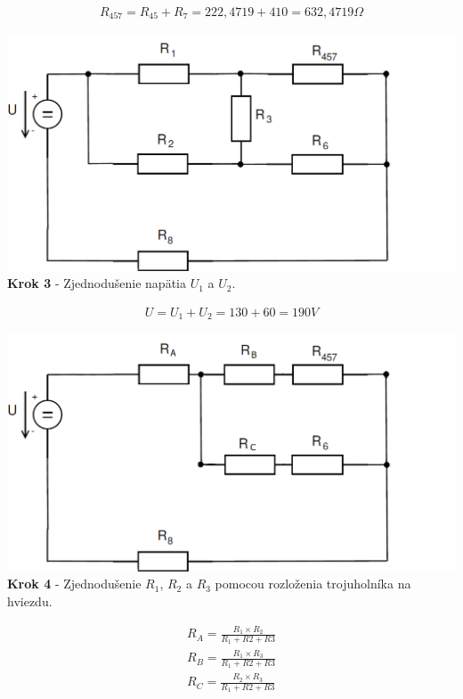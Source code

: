 \begin{gather*}
R_{457}=R_{45}+R_{7}=222,4719+410=632,4719\Omega 
\end{gather*}


\begin{center}
\includegraphics[scale=0.5,keepaspectratio]{fig/obr/Pr1_3.png} \\
\textbf{Krok 3} - Zjednodušenie napätia $U_{1}$ a $U_{2}$.
\end{center}

\begin{gather*}
U=U_{1}+U_{2}=130+60=190V 
\end{gather*}


\begin{center}
\includegraphics[scale=0.5,keepaspectratio]{fig/obr/Pr1_4.png} \\
\textbf{Krok 4} - Zjednodušenie  $R_{1}$, $R_{2}$ a  $R_{3}$ pomocou rozloženia trojuholníka na hviezdu.
\end{center}

\begin{gather*}
R_{A}=\frac{R_{1} \times R_{2}}{R_{1}+R{2}+R{3}}\\
R_{B}=\frac{R_{1} \times R_{3}}{R_{1}+R{2}+R{3}}\\
R_{C}=\frac{R_{2} \times R_{3}}{R_{1}+R{2}+R{3}}\\
\end{gather*}


